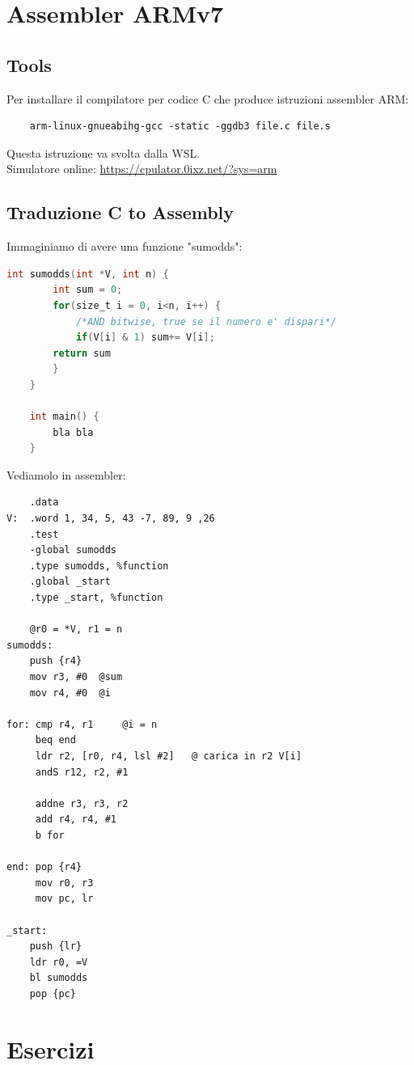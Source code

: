 \documentclass[12pt,a4paper]{article}
\let\oldsection\section
\renewcommand{\section}{\clearpage\oldsection}
\begin{document}
\section{Assembler ARMv7}
\subsection{Tools}
Per installare il compilatore per codice C che produce istruzioni assembler ARM:
\begin{lstlisting}
    arm-linux-gnueabihg-gcc -static -ggdb3 file.c file.s
\end{lstlisting}
Questa istruzione va svolta dalla WSL.\\
Simulatore online:
\href{https://cpulator.0ixz.net/?sys=arm}{https://cpulator.0ixz.net/?sys=arm}
\subsection{Traduzione C to Assembly}
Immaginiamo di avere una funzione "sumodds":
\begin{lstlisting}[language=C]
    int sumodds(int *V, int n) {
        int sum = 0;
        for(size_t i = 0, i<n, i++) {
            /*AND bitwise, true se il numero e' dispari*/
            if(V[i] & 1) sum+= V[i];
        return sum
        }
    }

    int main() {
        bla bla
    }

\end{lstlisting}
Vediamolo in assembler:
\begin{lstlisting}
    .data
V:  .word 1, 34, 5, 43 -7, 89, 9 ,26
    .test
    -global sumodds
    .type sumodds, %function
    .global _start
    .type _start, %function

    @r0 = *V, r1 = n
sumodds:
    push {r4}
    mov r3, #0  @sum
    mov r4, #0  @i

for: cmp r4, r1     @i = n
     beq end
     ldr r2, [r0, r4, lsl #2]   @ carica in r2 V[i]
     andS r12, r2, #1

     addne r3, r3, r2 
     add r4, r4, #1
     b for

end: pop {r4}
     mov r0, r3
     mov pc, lr

_start:
    push {lr}
    ldr r0, =V
    bl sumodds
    pop {pc}
\end{lstlisting}

\section{Esercizi}
\end{document}
